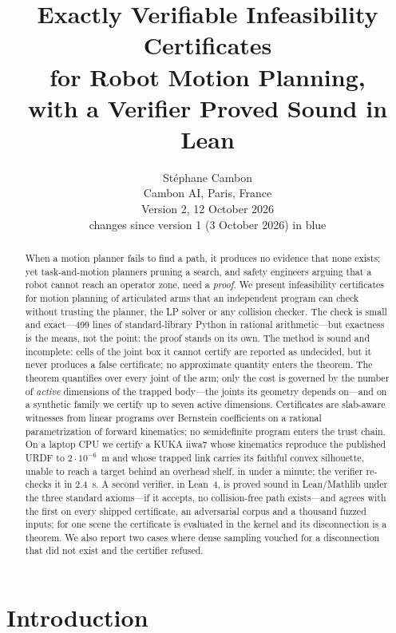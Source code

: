\documentclass[10pt,twocolumn,letterpaper]{article}
\title{\LARGE Exactly Verifiable Infeasibility Certificates\\for Robot Motion Planning,\\\large with a Verifier Proved Sound in Lean}
\author{St\'ephane Cambon\\
\small Cambon AI, Paris, France\\[2pt]\small Version 2, 12 October 2026\ifhl\\[2pt]\small\color{blue!65!black}changes since version 1 (3 October 2026) in blue\fi}
\date{}
\newif\ifhl \hlfalse  %
\newcommand{\new}[1]{\ifhl{\color{blue!65!black}#1}\else#1\fi}
\newcommand{\vone}[1]{#1}  %
\begin{document}
\maketitle

\begin{abstract}
When a motion planner fails to find a path, it produces no evidence that none exists; yet task-and-motion planners pruning a search, and safety engineers arguing that a robot cannot reach an operator zone, need a \emph{proof}. \vone{We present infeasibility certificates for motion planning of articulated arms that an independent program can check without trusting the planner, the LP solver or any collision checker. The check is small and exact---499 lines of standard-library Python in rational arithmetic---but exactness is the means, not the point: the proof stands on its own. The method is sound and incomplete: cells of the joint box it cannot certify are reported as undecided, but it never produces a false certificate; no approximate quantity enters the theorem. The theorem quantifies over every joint of the arm; only the cost is governed by the number of \emph{active} dimensions of the trapped body---the joints its geometry depends on---and on a synthetic family we certify up to seven active dimensions.} Certificates are slab-aware witnesses from linear programs over Bernstein coefficients on a rational parametrization of forward kinematics; no semidefinite program enters the trust chain. On a laptop CPU we certify a KUKA iiwa7 whose kinematics reproduce the published URDF to $2\cdot10^{-6}$~m and whose trapped link carries its faithful convex silhouette, unable to reach a target behind an overhead shelf, in under a minute; the verifier re-checks it in 2.4~s. \new{A second verifier, in Lean~4, is proved sound in Lean/Mathlib under the three standard axioms---if it accepts, no collision-free path exists---and agrees with the first on every shipped certificate, an adversarial corpus and a thousand fuzzed inputs; for one scene the certificate is evaluated in the kernel and its disconnection is a theorem.} We also report two cases where dense sampling vouched for a disconnection that did not exist and the certifier refused.
\end{abstract}

\section{Introduction}
\end{document}
